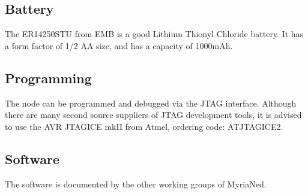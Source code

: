 \documentclass[a4paper,11pt]{report}
\begin{document}
\subsection{Battery}
The ER14250STU from EMB is a good Lithium Thionyl Chloride battery. It has a form factor of 1/2 AA size, and has a capacity of 1000mAh.
\subsection{Programming}
The node can be programmed and debugged via the JTAG interface. Although there are many second source suppliers of JTAG development tools, it is advised to use the AVR JTAGICE mkII from Atmel, ordering code: ATJTAGICE2.
\subsection{Software}
The software is documented by the other working groups of MyriaNed.
\end{document}
